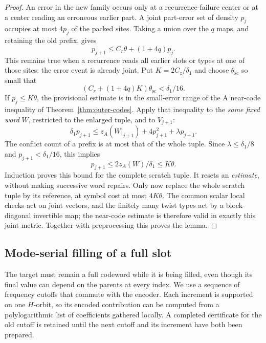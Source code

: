 \begin{proof}
An error in the new family occurs only at a recurrence-failure center
or at a center reading an erroneous earlier part.  A joint part-error
set of density $p_j$ occupies at most $4p_j$ of the packed sites.
Taking a union over the $q$ maps, and retaining the old prefix, gives
\begin{equation}\label{op:prefix-provisional}
                 p_{j+1}\le C_r\theta+(1+4q)p_j.
\end{equation}
This remains true when a recurrence reads all earlier slots or types
at one of those sites: the error event is already joint.
Put $K=2C_z/\delta_1$ and choose $\theta_{\mathrm{sc}}$ so small that
\begin{equation}\label{op:scratch-smallness}
          (C_r+(1+4q)K)\theta_{\mathrm{sc}}<\delta_1/16.
\end{equation}
If $p_j\le K\theta$, the provisional estimate is in the small-error
range of the A near-code inequality of Theorem~\ref{thm:outer-codes}.
Apply that inequality to the \emph{same fixed word} $W$, restricted
to the enlarged tuple, and to $V_{j+1}$:
\[
 \delta_1p_{j+1}
 \le z_A(W|_{j+1})+4p_{j+1}^2+\lambda p_{j+1}.
\]
The conflict count of a prefix is at most that of the whole tuple.
Since $\lambda\le\delta_1/8$ and $p_{j+1}<\delta_1/16$, this implies
\[
                 p_{j+1}\le 2z_A(W)/\delta_1\le K\theta.
\]
Induction proves this bound for the complete scratch tuple.
It resets an \emph{estimate}, without making successive word repairs.
Only now replace the whole scratch tuple by its reference, at symbol
cost at most $4K\theta$.  The common scalar local checks act on joint
vectors, and the finitely many twist types act by a block-diagonal
invertible map; the near-code estimate is therefore valid in exactly
this joint metric.  Together with preprocessing this proves the lemma.
\end{proof}

\subsection{Mode-serial filling of a full slot}

The target must remain a full codeword while it is being filled, even
though its final value can depend on the parents at every index. We use
a sequence of frequency cutoffs that commute with the encoder. Each
increment is supported on one $H$-orbit, so its encoded contribution
can be computed from a polylogarithmic list of coefficients gathered
locally. A completed certificate for the old cutoff is retained until
the next cutoff and its increment have both been prepared.


